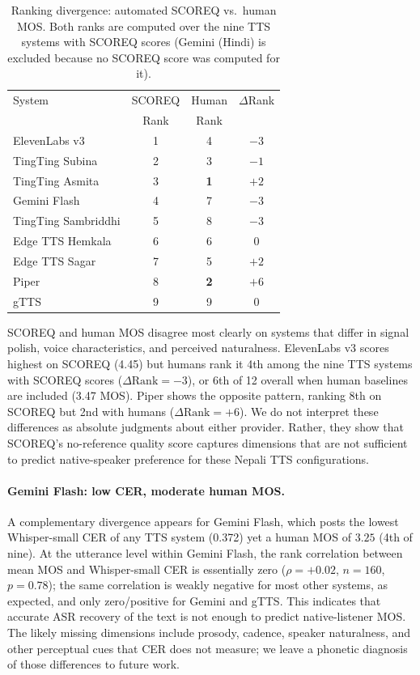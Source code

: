 \documentclass[11pt]{article}
\begin{document}
\begin{table}[t]
\centering
\caption{Ranking divergence: automated SCOREQ vs.\ human MOS. Both ranks are computed over the nine TTS systems with SCOREQ scores (Gemini (Hindi) is excluded because no SCOREQ score was computed for it).}
\label{tab:divergence}
\begin{tabular}{lccc}
\toprule
System & SCOREQ & Human & $\Delta$Rank \\
 & Rank & Rank & \\
\midrule
ElevenLabs v3 & 1 & 4 & $-3$ \\
TingTing Subina & 2 & 3 & $-1$ \\
TingTing Asmita & 3 & \textbf{1} & $+2$ \\
Gemini Flash & 4 & 7 & $-3$ \\
TingTing Sambriddhi & 5 & 8 & $-3$ \\
Edge TTS Hemkala & 6 & 6 & $0$ \\
Edge TTS Sagar & 7 & 5 & $+2$ \\
Piper & 8 & \textbf{2} & $+6$ \\
gTTS & 9 & 9 & $0$ \\
\bottomrule
\end{tabular}
\end{table}

SCOREQ and human MOS disagree most clearly on systems that differ in signal polish, voice characteristics, and perceived naturalness. ElevenLabs v3 scores highest on SCOREQ (4.45) but humans rank it 4th among the nine TTS systems with SCOREQ scores ($\Delta\text{Rank} = -3$), or 6th of 12 overall when human baselines are included (3.47 MOS). Piper shows the opposite pattern, ranking 8th on SCOREQ but 2nd with humans ($\Delta\text{Rank} = +6$). We do not interpret these differences as absolute judgments about either provider. Rather, they show that SCOREQ's no-reference quality score captures dimensions that are not sufficient to predict native-speaker preference for these Nepali TTS configurations.

\paragraph{Gemini Flash: low CER, moderate human MOS.} A complementary divergence appears for Gemini Flash, which posts the lowest Whisper-small CER of any TTS system (0.372) yet a human MOS of $3.25$ (4th of nine). At the utterance level within Gemini Flash, the rank correlation between mean MOS and Whisper-small CER is essentially zero ($\rho = +0.02$, $n = 160$, $p = 0.78$); the same correlation is weakly negative for most other systems, as expected, and only zero/positive for Gemini and gTTS. This indicates that accurate ASR recovery of the text is not enough to predict native-listener MOS. The likely missing dimensions include prosody, cadence, speaker naturalness, and other perceptual cues that CER does not measure; we leave a phonetic diagnosis of those differences to future work.
\end{document}
